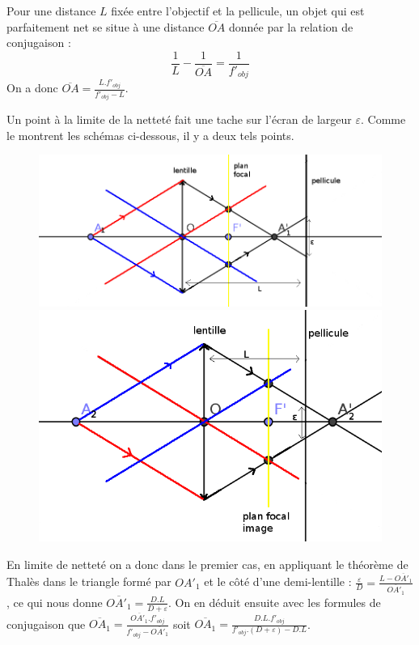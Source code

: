 \documentclass[10pt,a4paper]{article}
\begin{document}
\begin{enumerate}
Pour une distance $L$ fixée entre l'objectif et la pellicule, un objet qui est parfaitement net se situe à une distance $\overline{OA}$ donnée par la relation
de conjugaison : $$\frac{1}{L}-\frac{1}{\overline{OA}}=\frac{1}{f'_{obj}}$$
On a donc $\boxed{\overline{OA}=\frac{L.f'_{obj}}{f'_{obj}-L}}$.

Un point à la limite de la netteté fait une tache sur l'écran de largeur $\varepsilon$. Comme le montrent les schémas ci-dessous, il y a deux tels points.
\begin{figure}[h!]
\begin{minipage}{0.4\textwidth}
\includegraphics[scale=1.3]{profondeur_champ.png}
\end{minipage}
\hfill
\begin{minipage}{0.4\textwidth}
\includegraphics[scale=1.3]{profondeur_champ_2.png}
\end{minipage}
\end{figure}

En limite de netteté on a donc dans le premier cas, en appliquant le théorème de Thalès dans le triangle formé par $OA'_1$ et le côté d'une demi-lentille : 
$\frac{\varepsilon}{D}=\frac{L-\overline{OA'_1}}{\overline{OA'_1}}$, ce qui nous donne $\overline{OA'_1}=\frac{D.L}{D+\varepsilon}$. On en déduit ensuite avec
les formules de conjugaison que $\overline{OA_1}=\frac{\overline{OA'_1}.f'_{obj}}{f'_{obj}-\overline{OA'_1}}$ soit 
$\overline{OA_1}=\frac{D.L.f'_{obj}}{f'_{obj}.(D+\varepsilon)-D.L}$.
\smallskip


\end{enumerate}
\end{document}

